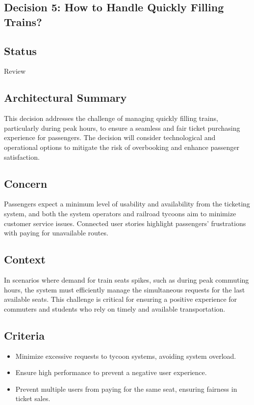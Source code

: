 \subsection{Decision 5: How to Handle Quickly Filling Trains?}

\subsection*{Status}
Review

\subsection*{Architectural Summary}
This decision addresses the challenge of managing quickly filling trains, particularly during peak hours, to ensure a seamless and fair ticket purchasing experience for passengers. The decision will consider technological and operational options to mitigate the risk of overbooking and enhance passenger satisfaction.

\subsection*{Concern}
Passengers expect a minimum level of usability and availability from the ticketing system, and both the system operators and railroad tycoons aim to minimize customer service issues. Connected user stories highlight passengers' frustrations with paying for unavailable routes.

\subsection*{Context}
In scenarios where demand for train seats spikes, such as during peak commuting hours, the system must efficiently manage the simultaneous requests for the last available seats. This challenge is critical for ensuring a positive experience for commuters and students who rely on timely and available transportation.

\subsection*{Criteria}
\begin{itemize}
    \item Minimize excessive requests to tycoon systems, avoiding system overload.
    \item Ensure high performance to prevent a negative user experience.
    \item Prevent multiple users from paying for the same seat, ensuring fairness in ticket sales.
\end{itemize}

